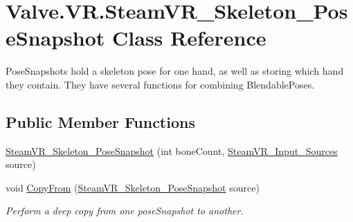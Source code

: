 \hypertarget{class_valve_1_1_v_r_1_1_steam_v_r___skeleton___pose_snapshot}{}\section{Valve.\+V\+R.\+Steam\+V\+R\+\_\+\+Skeleton\+\_\+\+Pose\+Snapshot Class Reference}
\label{class_valve_1_1_v_r_1_1_steam_v_r___skeleton___pose_snapshot}


Pose\+Snapshots hold a skeleton pose for one hand, as well as storing which hand they contain. They have several functions for combining Blendable\+Poses.  


\subsection*{Public Member Functions}
\begin{DoxyCompactItemize}
\item 
\mbox{\hyperlink{class_valve_1_1_v_r_1_1_steam_v_r___skeleton___pose_snapshot_ab25240c5aef693aeab7284d1b6a1b467}{Steam\+V\+R\+\_\+\+Skeleton\+\_\+\+Pose\+Snapshot}} (int bone\+Count, \mbox{\hyperlink{namespace_valve_1_1_v_r_a82e5bf501cc3aa155444ee3f0662853f}{Steam\+V\+R\+\_\+\+Input\+\_\+\+Sources}} source)
\item 
void \mbox{\hyperlink{class_valve_1_1_v_r_1_1_steam_v_r___skeleton___pose_snapshot_a96ae7177ed7545d473ad0e14e03afe01}{Copy\+From}} (\mbox{\hyperlink{class_valve_1_1_v_r_1_1_steam_v_r___skeleton___pose_snapshot}{Steam\+V\+R\+\_\+\+Skeleton\+\_\+\+Pose\+Snapshot}} source)
\begin{DoxyCompactList}\small\item\em Perform a deep copy from one pose\+Snapshot to another. \end{DoxyCompactList}\end{DoxyCompactItemize}
